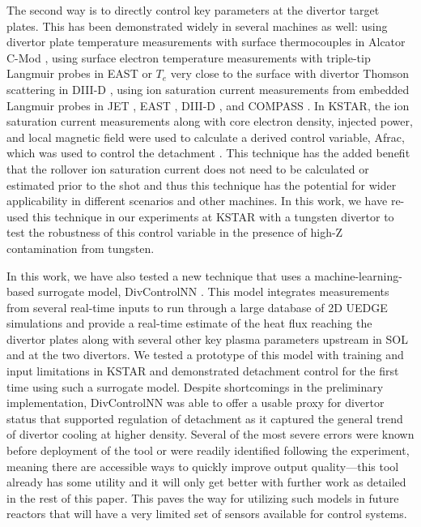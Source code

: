 The second way is to directly control key parameters at the divertor target plates.
This has been demonstrated widely in several machines as well:
using divertor plate temperature measurements with surface thermocouples in Alcator C-Mod \cite{Brunner_2017_NF},
using surface electron temperature measurements with triple-tip Langmuir probes in EAST \cite{Eldon_2021_NME} or $T_e$ very close to the surface with divertor Thomson scattering in DIII-D \cite{Eldon_2017_NF},
using ion saturation current measurements from embedded Langmuir probes in JET \cite{Guillemaut_2017_PPCF}, EAST \cite{Yuan_2020_FED}, \mbox{DIII-D} \cite{Eldon_2021_NME}, and COMPASS \cite{Khodunov_2021_PPCF}.
In KSTAR, the ion saturation current measurements along with core electron density, injected power, and local magnetic field were used to calculate a derived control variable, \ac{Afrac}, which was used to control the detachment \cite{Eldon_2022_PPCF}.
This technique has the added benefit that the rollover ion saturation current does not need to be calculated or estimated prior to the shot and thus this technique has the potential for wider applicability in different scenarios and other machines.
In this work, we have re-used this technique in our experiments at KSTAR with a tungsten divertor to test the robustness of this control variable in the presence of high-Z contamination from tungsten.

In this work, we have also tested a new technique that uses a machine-learning-based surrogate model, DivControlNN \cite{zhu_2025_pop}.
This model integrates measurements from several real-time inputs to run through a large database of 2D UEDGE \cite{Rognlien_1999_PP} simulations and provide a real-time estimate of the heat flux reaching the divertor plates along with several other key plasma parameters upstream in \ac{SOL} and at the two divertors.
We tested a prototype of this model with training and input limitations in KSTAR and demonstrated detachment control for the first time using such a surrogate model.
Despite shortcomings in the preliminary implementation, DivControlNN was able to offer a usable proxy for divertor status that supported regulation of detachment as it captured the general trend of divertor cooling at higher density.
Several of the most severe errors were known before deployment of the tool or were readily identified following the experiment, meaning there are accessible ways to quickly improve output quality---this tool already has some utility and it will only get better with further work as detailed in the rest of this paper.
This paves the way for utilizing such models in future reactors that will have a very limited set of sensors available for control systems.

